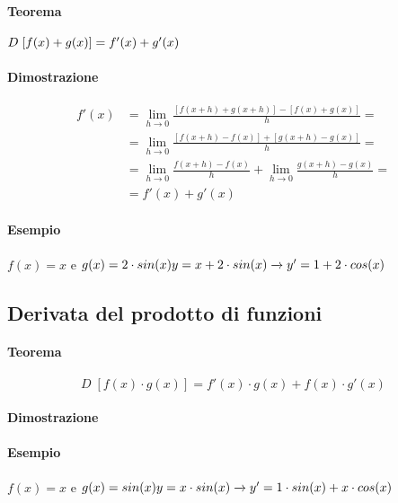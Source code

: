 \documentclass[a4paper,14pt]{extarticle}
\begin{document}
\paragraph{Teorema \\} $ \\ D\;[f(x) + g(x)]= f'(x) + g'(x)$
\paragraph{Dimostrazione \\}
\large
\begin{equation} \label{eq_derivata_somma_funzioni}
\begin{split}
f'(x) & = \lim_{h\to0}\frac{[f(x+h)+g(x+h)]-[f(x)+g(x)]}{h} = \\ & = \lim_{h\to0}\frac{[f(x+h)-f(x)]+[g(x+h)-g(x)]}{h} = \\
& = \lim_{h\to0}\frac{f(x+h)-f(x)}{h} + \lim_{h\to0}\frac{g(x+h)-g(x)}{h} = \\ & = f'(x) + g'(x)
\end{split}
\end{equation}
\normalsize

\paragraph{Esempio \\} $f(x) = x$ e $g(x)=2 \cdot sin(x) \\ y = x+2 \cdot sin(x) \xrightarrow{} y'=1+2 \cdot cos(x)$ 

\subsection{Derivata del prodotto di funzioni}
\paragraph{Teorema \\} \large \[ D\;[f(x) \cdot g(x)]= f'(x)  \cdot g(x) + f(x) \cdot g'(x) \] \normalsize
\paragraph{Dimostrazione \\}
\paragraph{Esempio \\} $f(x) = x$ e $g(x)=sin(x) \\ y = x \cdot sin(x) \xrightarrow{} y'=1 \cdot sin(x) + x \cdot cos(x)$ 
\end{document}
